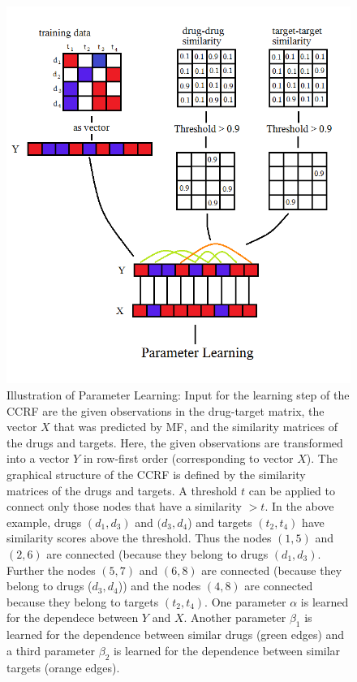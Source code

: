 \begin{figure}
\begin{center}
\includegraphics[scale=0.6]{ccrf_input.png}
\end{center}
\caption[Illustration of Parameter Learning]{Illustration of Parameter Learning: Input for the learning step of the CCRF are the given observations in the drug-target matrix, the vector $X$ that was predicted by MF, and the similarity matrices of the drugs and targets. Here, the given observations are transformed into a vector $Y$ in row-first order (corresponding to vector $X$). The graphical structure of the CCRF is defined by the similarity matrices of the drugs and targets. A threshold $t$ can be applied to connect only those nodes that have a similarity $>t$. In the above example, drugs $(d_1, d_3)$ and $(d_3, d_4$) and targets $(t_2, t_4)$ have similarity scores above the threshold. Thus the nodes $(1,5)$ and $(2,6)$ are connected (because they belong to drugs $(d_1, d_3)$. Further the nodes $(5,7)$ and $(6,8)$ are connected (because they belong to drugs ($d_3, d_4$)) and the nodes $(4,8)$ are connected because they belong to targets $(t_2, t_4)$. One parameter $\alpha$ is learned for the dependece between $Y$ and $X$. Another parameter $\beta_1$ is learned for the dependence between similar drugs (green edges) and a third parameter $\beta_2$ is learned for the dependence between similar targets (orange edges).}
\label{fig:ccrf_param_learn}
\end{figure}


